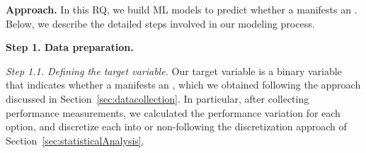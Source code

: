 \noindent \textbf{Approach.}
In this RQ, we build ML models to predict whether a \instance manifests an \inconsistent. %
Below, we describe the detailed steps involved in our modeling process.

\noindent\textbf{Step 1. Data preparation.}

\textit{Step 1.1. Defining the target variable.} Our target variable is a binary variable that indicates whether a \instance manifests an \inconsistent, which we obtained following the approach discussed in Section~\ref{sec:datacollection}. In particular, after collecting performance measurements, we calculated the performance variation for each option, and discretize each \instance into \inconsistent or non-\inconsistent following the discretization approach of Section~\ref{sec:statisticalAnalysis}.


